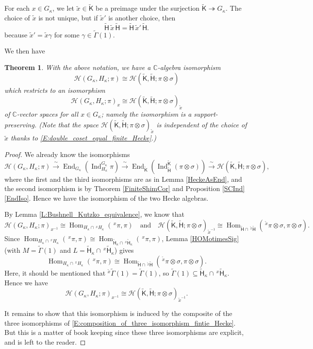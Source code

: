 \documentclass[10pt, letterpaper]{amsart}
\theoremstyle{plain}
\newtheorem{Thm}[equation]{Theorem}
\theoremstyle{definition}
\numberwithin{equation}{section}
\newcommand{\C}{\mathbb{C}}
\newcommand{\xt}{\tilde{x}}
\newcommand{\Gammaft}{\widetilde{\mathsf{\Gamma}}}
\newcommand{\Ind}{\operatorname{Ind}}
\newcommand{\End}{\operatorname{End}}
\newcommand{\Hom}{\operatorname{Hom}}
\newcommand{\Hcal}{\mathcal{H}}
\newcommand{\Hft}{\widetilde{\mathsf{H}}}
\newcommand{\Kft}{\widetilde{\mathsf{K}}}
\newcommand{\qand}{{\quad\text{and}\quad}}
\begin{document}
For each $x\in G_{\kappa}$, we let $\xt\in\Kft$ be a preimage under the surjection $\Kft\twoheadrightarrow G_{\kappa}$. The choice of $\xt$ is not unique, but if $\xt'$ is another choice, then
\begin{equation}\label{E:double_coset_equal_finite_Hecke}
    \Hft\,\xt\,\Hft=\Hft\,\xt'\,\Hft.
\end{equation}
because $\xt'=\xt \gamma$ for some $\gamma\in\Gammaft(1)$.

We then have
\begin{Thm}\label{T:finite_Hecke_algebra_isom}
    With the above notation, we have a $\C$-algebra isomorphism 
    \[
    \Hcal(G_{\kappa}, H_{\kappa}; \pi)\cong \Hcal(\Kft, \Hft; \pi\otimes\sigma)
    \]
    which restricts to an isomorphism
    \[
    \Hcal(G_{\kappa}, H_{\kappa}; \pi)_x\cong \Hcal(\Kft, \Hft; \pi\otimes\sigma)_{\xt}
    \]
    of $\C$-vector spaces for all $x\in G_{\kappa}$; namely the isomorphism is a support-preserving. (Note that the space $\Hcal(\Kft, \Hft; \pi\otimes\sigma)_{\xt}$ is independent of the choice of $\xt$ thanks to \eqref{E:double_coset_equal_finite_Hecke}.)
\end{Thm}
\begin{proof}
We already know the isomorphisms
\begin{equation}\label{E:composition_of_three_isomorphism_fintie_Hecke}
\Hcal(G_{\kappa},H_{\kappa};\pi)\xrightarrow{\;\sim\;} \End_{G_{\kappa}}(\Ind_{H_{\kappa}}^{G_{\kappa}}\pi)
\xrightarrow{\;\sim\;}\End_{\Kft}(\Ind_{\Hft}^{\Kft}(\pi\otimes \sigma))\xrightarrow{\;\sim\;}\Hcal(\Kft,\Hft;\pi\otimes \sigma),
\end{equation}
where the first and the third isomorphisms are as in Lemma \ref{HeckeAsEnd}, and the second isomorphism is by Theorem \ref{FiniteShimCor} and Proposition \ref{SCInd} \eqref{EndIso}. Hence we have the isomorphism of the two Hecke algebras.

By Lemma \ref{L:Bushnell_Kutzko_equivalence}, we know that
\[
\Hcal(G_{\kappa}, H_{\kappa}; \pi)_{x^{-1}}\cong\Hom_{H_\kappa\cap{\,^{x}H_\kappa}}(\,^{x}\pi, \pi)\qand
\Hcal(\Kft, \Hft; \pi\otimes\sigma)_{\xt^{-1}}\cong\Hom_{\Hft\cap{\,^{\xt}\Hft}}(\,^{\xt}\pi\otimes\sigma, \pi\otimes\sigma).
\]
Since $\Hom_{H_\kappa\cap{\,^{x}H_\kappa}}(\,^{x}\pi, \pi)\cong \Hom_{\Hft_\kappa\cap{\,^{x}\Hft_\kappa}}(\,^{x}\pi, \pi)$, Lemma \ref{HOMotimesSig} (with $M=\Gammaft(1)$ and $L=\Hft_\kappa\cap{\,^{x}\Hft_\kappa}$) gives
\[
\Hom_{H_\kappa\cap{\,^{x}H_\kappa}}(\,^{x}\pi, \pi)\cong \Hom_{\Hft\cap{\,^{\xt}\Hft}}(\,^{\xt}\pi\otimes\sigma, \pi\otimes\sigma).
\]
Here, it should be mentioned that $^{\xt}\Gammaft(1)=\Gammaft(1)$, so $\Gammaft(1)\subseteq \Hft_\kappa\cap{\,^{x}\Hft_\kappa}$. Hence we have
\[
\Hcal(G_{\kappa}, H_{\kappa}; \pi)_{x^{-1}}\cong \Hcal(\Kft, \Hft; \pi\otimes\sigma)_{\xt^{-1}}.
\]

It remains to show that this isomorphism is induced by the composite of the three isomorphisms of \eqref{E:composition_of_three_isomorphism_fintie_Hecke}.  But this is a matter of book keeping since these three isomorphisms are explicit, and is left to the reader.
\end{proof}
\end{document}
